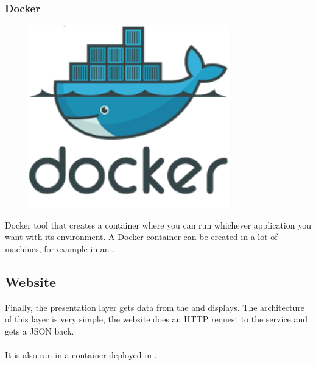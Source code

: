 \subsubsection{Docker} \label{docker}

\begin{figure}[H]
\includegraphics[scale=0.1]{resources/docker-logo.png}
\end{figure}

Docker\cite{docker} tool that creates a container where you can run whichever application you want with its environment. A Docker container can be created in a lot of machines, for example in an .


\subsection{Website}

Finally, the presentation layer gets data from the  and displays. The architecture of this layer is very simple, the website does an HTTP request to the service and gets a JSON back.
\\\\
It is also ran in a  container deployed in .



